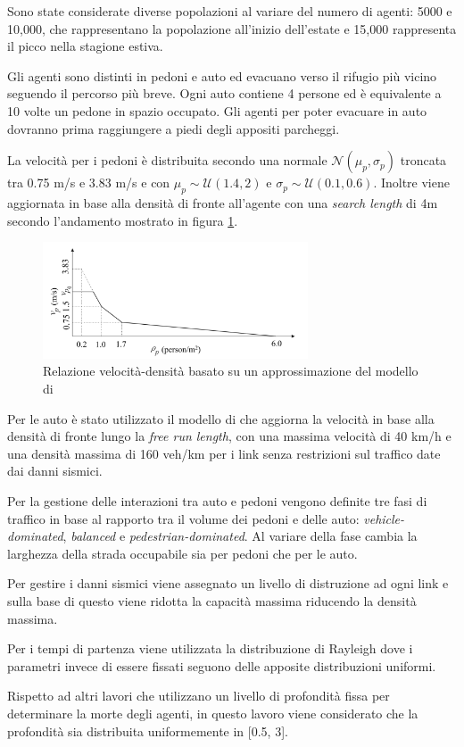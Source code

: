 Sono state considerate diverse popolazioni al variare del numero di agenti: 5000 e 10,000,
che rappresentano la popolazione all'inizio dell'estate e 15,000 rappresenta il picco nella stagione estiva.

Gli agenti sono distinti in pedoni e auto ed evacuano verso il rifugio più vicino seguendo il percorso più breve.
Ogni auto contiene 4 persone ed è equivalente a 10 volte un pedone in spazio occupato.
Gli agenti per poter evacuare in auto dovranno prima raggiungere a piedi degli appositi parcheggi.

La velocità per i pedoni è distribuita secondo una normale $\mathcal{N}(\mu_p,\sigma_p)$ troncata tra 0.75 m/s e 3.83 m/s e
con $\mu_p \sim \mathcal{U}(1.4, 2)$ e $\sigma_p \sim \mathcal{U}(0.1, 0.6)$.
Inoltre viene aggiornata in base alla densità di fronte all'agente con una \textit{search length} di 4m secondo l'andamento mostrato in figura \ref{fig:wang2021}.

\begin{figure}[ht]
    \centering
    \includegraphics[width=0.7\textwidth]{images/speed_WANG.png}
    \caption{Relazione velocità-densità \textcite{wang2021novel} basato su un approssimazione del modello di \textcite{goto2012tsunami}}
    \label{fig:wang2021}
\end{figure}

Per le auto è stato utilizzato il modello di \textcite{greenshields1935study} che aggiorna la velocità in base alla densità di fronte lungo la \textit{free run length},
con una massima velocità di 40 km/h e una densità massima di 160 veh/km per i link senza restrizioni sul traffico date dai danni sismici.

Per la gestione delle interazioni tra auto e pedoni vengono definite tre fasi di traffico in base al rapporto
tra il volume dei pedoni e delle auto: \textit{vehicle-dominated}, \textit{balanced} e \textit{pedestrian-dominated}.
Al variare della fase cambia la larghezza della strada occupabile sia per pedoni che per le auto.

Per gestire i danni sismici viene assegnato un livello di distruzione ad ogni link e sulla base di questo viene 
ridotta la capacità massima riducendo la densità massima.

Per i tempi di partenza viene utilizzata la distribuzione di Rayleigh dove i parametri
invece di essere fissati seguono delle apposite distribuzioni uniformi.

Rispetto ad altri lavori che utilizzano un livello di profondità fissa per determinare la morte degli agenti, in questo lavoro
viene considerato che la profondità sia distribuita uniformemente in [0.5, 3]. 
